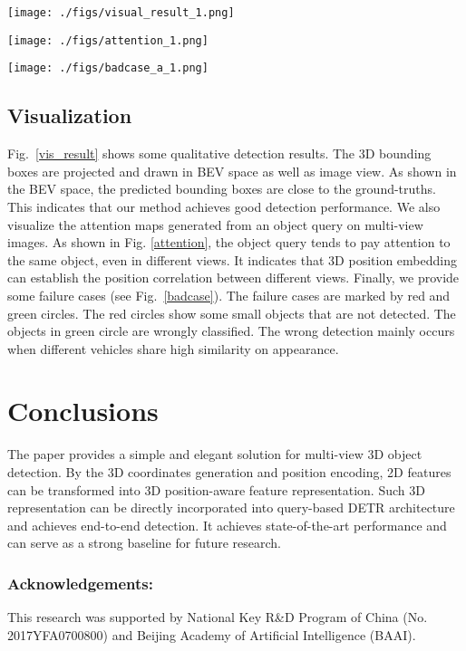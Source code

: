 \documentclass[runningheads]{llncs}
\begin{document}
\begin{figure*}[t]
	\centering  
	\texttt{[image: ./figs/visual\_result\_1.png]}  
	\caption{Qualitative analysis of detection results in BEV and image views. The score threshold is 0.25, while the  backbone is  ResNet-101.
	The 3D bounding boxes are drawn with different colors to distinguish different classes. 
    }  
	\label{vis_result}
\end{figure*}
\begin{figure*}[t!]
	\centering  
	\texttt{[image: ./figs/attention\_1.png]}  
	\caption{Visualization of attention maps, generated from an object query (corresponding to the truck) on multi-view images. Both front-left and back-left views have a high response on the attention map.}
	\label{attention}
\end{figure*}
\begin{figure*}[t!]
	\centering  
	\texttt{[image: ./figs/badcase\_a\_1.png]}  
	\caption{Failure cases of PETR. We mark the failure cases by red and green circles. The red circles are some small objects that are not detected. The green circles are objects that are wrongly classified.}
	\label{badcase}
\end{figure*}
\subsection{Visualization}
Fig.~\ref{vis_result} shows some qualitative detection results. The 3D bounding boxes are projected and drawn in BEV space as well as image view. As shown in the BEV space, the predicted bounding boxes are close to the ground-truths. This indicates that our method achieves good detection performance. 
We also visualize the attention maps generated from an object query on multi-view images. As shown in Fig. \ref{attention}, the object query tends to pay attention to the same object, even in different views. It indicates that 3D position embedding can establish the position correlation between different views. Finally, we provide some failure cases (see Fig.~\ref{badcase}). The failure cases are marked by red and green circles. The red circles show some small objects that are not detected. 
The objects in green circle are wrongly classified. The wrong detection mainly occurs when different vehicles share high similarity on appearance.

\section{Conclusions}
The paper provides a simple and elegant solution for multi-view 3D object detection. By the 3D coordinates generation and position encoding, 2D features can be transformed into 3D position-aware feature representation. Such 3D representation can be directly incorporated into query-based DETR architecture and achieves end-to-end detection. It achieves state-of-the-art performance and can serve as a strong baseline for future research.

\subsubsection{Acknowledgements:} This research was supported by National Key R\&D Program of China (No. 2017YFA0700800) and Beijing Academy of Artificial Intelligence (BAAI).



\end{document}
